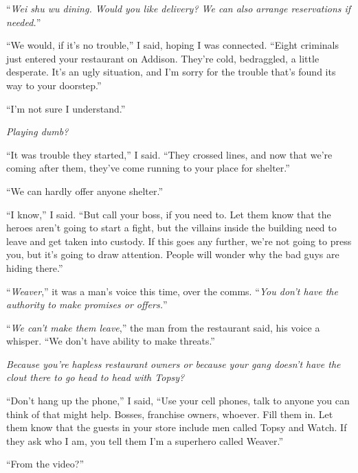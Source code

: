 ``\emph{Wei shu wu dining.  Would you like delivery?  We can also arrange reservations if needed.}''



``We would, if it's no trouble,'' I said, hoping I was connected.  ``Eight criminals just entered your restaurant on Addison.  They're cold, bedraggled, a little desperate.  It's an ugly situation, and I'm sorry for the trouble that's found its way to your doorstep.''



``I'm not sure I understand.''



\emph{Playing dumb?}



``It was trouble they started,'' I said.  ``They crossed lines, and now that we're coming after them, they've come running to your place for shelter.''



``We can hardly offer anyone shelter.''



``I know,'' I said.  ``But call your boss, if you need to.  Let them know that the heroes aren't going to start a fight, but the villains inside the building need to leave and get taken into custody.  If this goes any further, we're not going to press you, but it's going to draw attention.  People will wonder why the bad guys are hiding there.''



``\emph{Weaver},'' it was a man's voice this time, over the comms.  ``\emph{You don't have the authority to make promises or offers.}''



``\emph{We can't make them leave},'' the man from the restaurant said, his voice a whisper.  ``We don't have ability to make threats.''



\emph{Because you're hapless restaurant owners or because your gang doesn't have the clout there to go head to head with Topsy?}



``Don't hang up the phone,'' I said, ``Use your cell phones, talk to anyone you can think of that might help.  Bosses, franchise owners, whoever.  Fill them in.  Let them know that the guests in your store include men called Topsy and Watch.  If they ask who I am, you tell them I'm a superhero called Weaver.''



``From the video?''



